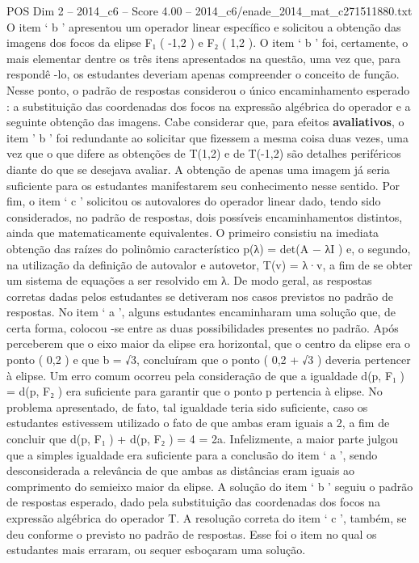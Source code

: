 \begin{textsample}{POS Dim 2 – 2014\_c6 – Score 4.00 – 2014\_c6/enade\_2014\_mat\_c271511880.txt}
O item ‘ b ’ apresentou um operador linear específico e solicitou a obtenção das imagens dos focos da elipse F₁ ( -1,2 ) e F₂ ( 1,2 ).
O item ‘ b ’ foi, certamente, o mais elementar dentre os três itens apresentados na questão, uma vez que, para respondê -lo, os estudantes deveriam apenas compreender o conceito de função.
Nesse ponto, o padrão de respostas considerou o único encaminhamento esperado : a substituição das coordenadas dos focos na expressão algébrica do operador e a seguinte obtenção das imagens.
Cabe considerar que, para efeitos \textbf{avaliativos}, o item ’ b ’ foi redundante ao solicitar que fizessem a mesma coisa duas vezes, uma vez que o que difere as obtenções de T(1,2) e de T(-1,2) são detalhes periféricos diante do que se desejava avaliar.
A obtenção de apenas uma imagem já seria suficiente para os estudantes manifestarem seu conhecimento nesse sentido.
Por fim, o item ‘ c ’ solicitou os autovalores do operador linear dado, tendo sido considerados, no padrão de respostas, dois possíveis encaminhamentos distintos, ainda que matematicamente equivalentes.
O primeiro consistiu na imediata obtenção das raízes do polinômio característico p(λ) = det(A − λI ) e, o segundo, na utilização da definição de autovalor e autovetor, T(v) = λ·v, a fim de se obter um sistema de equações a ser resolvido em λ.
De modo geral, as respostas corretas dadas pelos estudantes se detiveram nos casos previstos no padrão de respostas.
No item ‘ a ’, alguns estudantes encaminharam uma solução que, de certa forma, colocou -se entre as duas possibilidades presentes no padrão.
Após perceberem que o eixo maior da elipse era horizontal, que o centro da elipse era o ponto ( 0,2 ) e que b = √3, concluíram que o ponto ( 0,2 + √3 ) deveria pertencer à elipse.
Um erro comum ocorreu pela consideração de que a igualdade d(p, F₁ ) = d(p, F₂ ) era suficiente para garantir que o ponto p pertencia à elipse.
No problema apresentado, de fato, tal igualdade teria sido suficiente, caso os estudantes estivessem utilizado o fato de que ambas eram iguais a 2, a fim de concluir que d(p, F₁ ) + d(p, F₂ ) = 4 = 2a.
Infelizmente, a maior parte julgou que a simples igualdade era suficiente para a conclusão do item ‘ a ’, sendo desconsiderada a relevância de que ambas as distâncias eram iguais ao comprimento do semieixo maior da elipse.
A solução do item ‘ b ’ seguiu o padrão de respostas esperado, dado pela substituição das coordenadas dos focos na expressão algébrica do operador T.
A resolução correta do item ‘ c ’, também, se deu conforme o previsto no padrão de respostas.
Esse foi o item no qual os estudantes mais erraram, ou sequer esboçaram uma solução.

\end{textsample}
